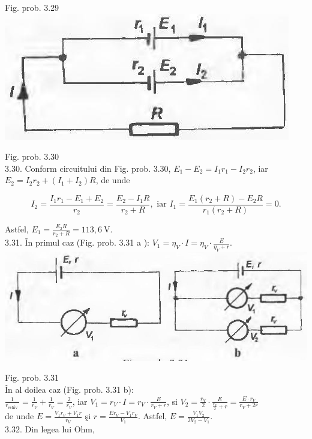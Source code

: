 \documentclass[10pt]{article}
\begin{document}
Fig. prob. 3.29\\
\includegraphics[max width=\textwidth, center]{2025_07_01_5b3ff9fa0d508c8e9f17g-347}

Fig. prob. 3.30\\
3.30. Conform circuitului din Fig. prob. 3.30, $E_{1}-E_{2}=I_{1} r_{1}-I_{2} r_{2}$, iar $E_{2}=I_{2} r_{2}+\left(I_{1}+I_{2}\right) R$, de unde

$$
I_{2}=\frac{I_{1} r_{1}-E_{1}+E_{2}}{r_{2}}=\frac{E_{2}-I_{1} R}{r_{2}+R}, \text { iar } I_{1}=\frac{E_{1}\left(r_{2}+R\right)-E_{2} R}{r_{1}\left(r_{2}+R\right)}=0 .
$$

Astfel, $E_{1}=\frac{E_{2} R}{r_{2}+R}=113,6 \mathrm{~V}$.\\
3.31. În primul caz (Fig. prob. 3.31 a ): $V_{1}=\eta_{V} \cdot I=\eta_{V} \cdot \frac{E}{\eta_{V}+r}$.\\
\includegraphics[max width=\textwidth, center]{2025_07_01_5b3ff9fa0d508c8e9f17g-347(2)}

Fig. prob. 3.31\\
În al doilea caz (Fig. prob. 3.31 b):\\
$\frac{1}{r_{\text {echiv }}}=\frac{1}{r_{V}}+\frac{1}{r_{V}}=\frac{2}{r_{V}}$, iar $V_{1}=r_{V} \cdot I=r_{V} \cdot \frac{E}{r_{V}+r}$, si $V_{2}=\frac{r_{V}}{2} \cdot \frac{E}{\frac{r_{V}}{2}+r}=\frac{E \cdot r_{V}}{r_{V}+2 r}$\\
de unde $E=\frac{V_{1} r_{V}+V_{1} r}{r_{V}}$ şi $r=\frac{E r_{V}-V_{1} r_{V}}{V_{1}}$. Astfel, $E=\frac{V_{1} V_{2}}{2 V_{2}-V_{1}}$.\\
3.32. Din legea lui Ohm,
\end{document}
